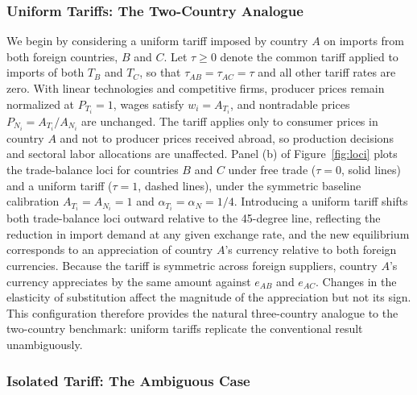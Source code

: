 \documentclass[11pt]{article}
\theoremstyle{plain}
\theoremstyle{remark}
\numberwithin{lemma}{section}
\numberwithin{proposition}{section}
\numberwithin{corollary}{section}
\newcommand{\rev}[1]{{\color{RevBlue}#1}}
\begin{document}
\subsubsection{Uniform Tariffs: The Two-Country Analogue}

We begin by considering a uniform tariff imposed by country $A$ on imports from both foreign countries, $B$ and $C$. Let $\tau \ge 0$ denote the common tariff applied to imports of both $T_B$ and $T_C$, so that $\tau_{AB} = \tau_{AC} = \tau$ and all other tariff rates are zero. With linear technologies and competitive firms, producer prices remain normalized at $P_{T_i} = 1$, wages satisfy $w_i = A_{T_i}$, and nontradable prices $P_{N_i} = A_{T_i}/A_{N_i}$ are unchanged. The tariff applies only to consumer prices in country $A$ and not to producer prices received abroad, so production decisions and sectoral labor allocations are unaffected. \rev{Panel (b) of Figure~\ref{fig:loci}} plots the trade-balance loci for countries $B$ and $C$ under free trade ($\tau = 0$, solid lines) and a uniform tariff ($\tau = 1$, dashed lines), under the symmetric baseline calibration $A_{T_i} = A_{N_i} = 1$ and $\alpha_{T_i} = \alpha_N = 1/4$.
Introducing a uniform tariff shifts both trade-balance loci outward relative to the 45-degree line, reflecting the reduction in import demand at any given exchange rate, and the new equilibrium corresponds to an appreciation of country $A$'s currency relative to both foreign currencies. Because the tariff is symmetric across foreign suppliers, country $A$'s currency appreciates by the same amount against $e_{AB}$ and $e_{AC}$. Changes in the elasticity of substitution affect the magnitude of the appreciation but not its sign. This configuration therefore provides the natural three-country analogue to the two-country benchmark: uniform tariffs replicate the conventional result unambiguously.

\subsubsection{Isolated Tariff: The Ambiguous Case}
\end{document}
